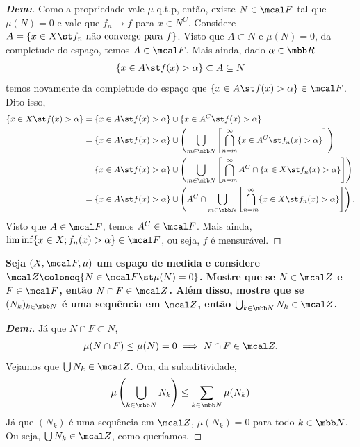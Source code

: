\begin{proof}[\textbf{Dem:}]Como a propriedade vale $\mu$-q.t.p, então, existe $N \in \mcal F$ tal que $\mu(N) = 0$ e 
  vale que $f_n \rightarrow f$ para $x \in N^C$. Considere $A = \{x \in X\st f_n\text{ não converge para }f\}$. Visto que 
  $A \subset N$ e $\mu(N) = 0$, da completude do espaço, temos $A \in \mcal F$. Mais ainda, dado $\alpha \in \mbb R$
  \begin{align*}
    \{x \in A \st f(x) > \alpha\} \subset A \subseteq N
  \end{align*}
  temos novamente da completude do espaço que $\{x \in A \st f(x)>\alpha\} \in \mcal F$. Dito isso, 
  \begin{align*}
    \{x \in X \st f(x)> \alpha \} &= \{x \in A \st f(x)>\alpha\}\cup \{x \in A^C \st f(x) > \alpha\}\\
    &= \{x \in A \st f(x)>\alpha\}\cup \left(\bigcup\limits_{m \in \mbb N} \left[
      \bigcap\limits_{n = m}^{\infty}\{x \in A^C \st f_n(x) > \alpha\} \right]\right)\\
    &= \{x \in A \st f(x)>\alpha\}\cup \left(\bigcup\limits_{m \in \mbb N} \left[
      \bigcap\limits_{n = m}^{\infty}A^C\cap\{x \in X \st f_n(x) > \alpha\} \right]\right)\\
    &= \{x \in A \st f(x)>\alpha\}\cup \left(A^C \cap \bigcup\limits_{m \in \mbb N} \left[
      \bigcap\limits_{n = m}^{\infty}\{x \in X \st f_n(x) > \alpha\} \right]\right). 
  \end{align*}
  Visto que $A \in \mcal F$, temos $A^C \in \mcal F$. Mais ainda, $\lim \inf \{x \in X; f_n(x)> \alpha\} \in \mcal F$, 
  ou seja, $f$ é mensurável.
\end{proof}
\biglinend
\newpage
{}
\bigline 
\textbf{Seja $(X, \mcal F, \mu)$ um espaço de medida e considere $\mcal Z\coloneq \{N \in \mcal F\st \mu(N) = 0\}$. 
Mostre que se $N \in \mcal Z$ e $F \in \mcal F$, então $N \cap F \in \mcal Z$. Além disso, mostre que se 
$(N_k)_{k \in \mbb N}$ é uma sequência em $\mcal Z$, então $\bigcup_{k \in \mbb N} N_k \in \mcal Z$.}
\begin{proof}[\textbf{Dem:}]
 Já que $N \cap F \subset N$, 
  \begin{align*}
    \mu(N \cap F) \le \mu(N) = 0 \implies N\cap F \in \mcal Z. 
  \end{align*}
  Vejamos que $\bigcup N_k \in \mcal Z$. Ora, da subaditividade, 
  \begin{align*}
    \mu\left(\bigcup\limits_{k \in \mbb N} N_k\right) \le \sum_{k \in \mbb N} \mu(N_k)
  \end{align*}
  Já que $(N_k)$ é uma sequência em $\mcal Z$, $\mu(N_k) = 0$ para todo $k \in \mbb N$. Ou seja, 
  $\bigcup N_k \in \mcal Z$, como queríamos.
\end{proof}
